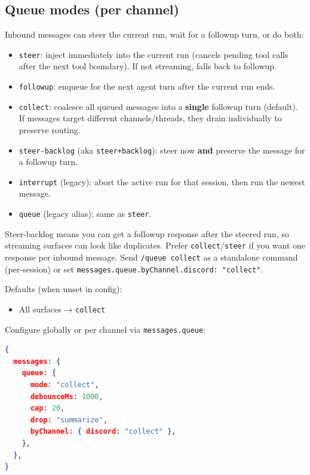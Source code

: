 \subsection{Queue modes (per channel)}


Inbound messages can steer the current run, wait for a followup turn, or do both:

\begin{itemize}
  \item \texttt{steer}: inject immediately into the current run (cancels pending tool calls after the next tool boundary). If not streaming, falls back to followup.
  \item \texttt{followup}: enqueue for the next agent turn after the current run ends.
  \item \texttt{collect}: coalesce all queued messages into a \textbf{single} followup turn (default). If messages target different channels/threads, they drain individually to preserve routing.
  \item \texttt{steer-backlog} (aka \texttt{steer+backlog}): steer now \textbf{and} preserve the message for a followup turn.
  \item \texttt{interrupt} (legacy): abort the active run for that session, then run the newest message.
  \item \texttt{queue} (legacy alias): same as \texttt{steer}.
\end{itemize}


Steer-backlog means you can get a followup response after the steered run, so
streaming surfaces can look like duplicates. Prefer \texttt{collect}/\texttt{steer} if you want
one response per inbound message.
Send \texttt{/queue collect} as a standalone command (per-session) or set \texttt{messages.queue.byChannel.discord: "collect"}.

Defaults (when unset in config):

\begin{itemize}
  \item All surfaces → \texttt{collect}
\end{itemize}


Configure globally or per channel via \texttt{messages.queue}:

\begin{lstlisting}[language=json]
{
  messages: {
    queue: {
      mode: "collect",
      debounceMs: 1000,
      cap: 20,
      drop: "summarize",
      byChannel: { discord: "collect" },
    },
  },
}
\end{lstlisting}


